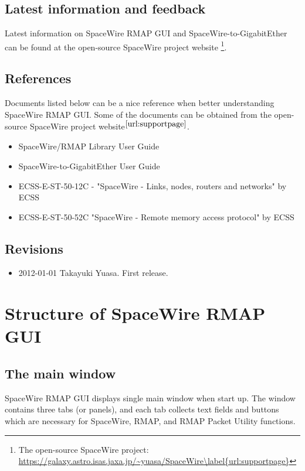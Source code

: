 \documentclass[a4paper,10pt]{article}
\begin{document}
\subsection{Latest information and feedback}
Latest information on SpaceWire RMAP GUI and SpaceWire-to-GigabitEther can be found at the open-source SpaceWire project website \footnote{The open-source SpaceWire project: \url{https://galaxy.astro.isas.jaxa.jp/~yuasa/SpaceWire\label{url:supportpage}}}.

\subsection{References}
Documents listed below can be a nice reference when better understanding SpaceWire RMAP GUI. Some of the documents can be obtained from the open-source SpaceWire project website$^\mathrm{\ref{url:supportpage}}$.
\begin{itemize}
  \setlength{\parskip}{0cm}
  \setlength{\itemsep}{0cm}
\item SpaceWire/RMAP Library User Guide
\item SpaceWire-to-GigabitEther User Guide
\item ECSS-E-ST-50-12C - "SpaceWire - Links, nodes, routers and networks" by ECSS
\item ECSS-E-ST-50-52C "SpaceWire - Remote memory access protocol" by ECSS
\end{itemize}

\subsection{Revisions}
\begin{itemize}
  \setlength{\parskip}{0cm}
  \setlength{\itemsep}{0cm}
\item 2012-01-01 Takayuki Yuasa. First release.
\end{itemize}



\section{Structure of SpaceWire RMAP GUI}

\subsection{The main window}
SpaceWire RMAP GUI displays single main window when start up.
The window contains three tabs (or panels), and each tab collects text fields and buttons which are necessary for SpaceWire, RMAP, and RMAP Packet Utility functions.
\end{document}
